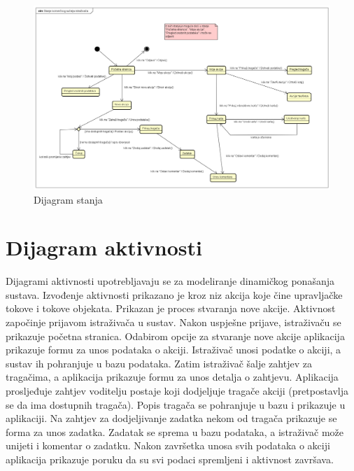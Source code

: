 			\begin{figure}[H]
				\includegraphics[scale=0.3]{dijagrami/DijagramStanja.png} 
				\centering
				\caption{Dijagram stanja}
				\label{fig:promjene}
			\end{figure}
			
			
			\eject 
		
		\section{Dijagram aktivnosti}
			
			Dijagrami aktivnosti upotrebljavaju se za modeliranje dinamičkog ponašanja sustava. Izvođenje aktivnosti prikazano je kroz niz akcija koje čine upravljačke tokove i tokove objekata. Prikazan je proces stvaranja nove akcije. Aktivnost započinje prijavom istraživača u sustav. Nakon uspješne prijave, istraživaču se prikazuje početna stranica. Odabirom opcije za stvaranje nove akcije aplikacija prikazuje formu za unos podataka o akciji. Istraživač unosi podatke o akciji, a sustav ih pohranjuje u bazu podataka. Zatim istraživač šalje zahtjev za tragačima, a aplikacija prikazuje formu za unos detalja o zahtjevu. Aplikacija prosljeđuje zahtjev voditelju postaje koji dodjeljuje tragače akciji (pretpostavlja se da ima dostupnih tragača). Popis tragača se pohranjuje u bazu i prikazuje u aplikaciji. Na zahtjev za dodjeljivanje zadatka nekom od tragača prikazuje se forma za unos zadatka. Zadatak se sprema u bazu podataka, a istraživač može unijeti i komentar o zadatku. Nakon završetka unosa svih podataka o akciji aplikacija prikazuje poruku da su svi podaci spremljeni i aktivnost završava.
			
